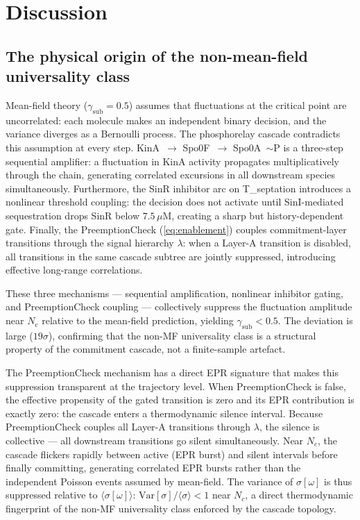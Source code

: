 \documentclass[11pt,a4paper]{article}
\newcommand{\gsub}{\gamma_{\mathrm{sub}}}
\newcommand{\Nc}{N_{\mathrm{c}}}
\begin{document}
\section{Discussion}
\label{sec:discussion}

\subsection{The physical origin of the non-mean-field universality class}

Mean-field theory ($\gsub = 0.5$) assumes that fluctuations at the
critical point are uncorrelated: each molecule makes an independent
binary decision, and the variance diverges as a Bernoulli process.
The phosphorelay cascade contradicts this assumption at every step.
KinA~$\to$ Spo0F~$\to$ Spo0A~$\sim$P is a three-step sequential amplifier:
a fluctuation in KinA activity propagates multiplicatively through
the chain, generating correlated excursions in all downstream species
simultaneously.
Furthermore, the SinR inhibitor arc on T\_septation introduces a
nonlinear threshold coupling: the decision does not activate until
SinI-mediated sequestration drops SinR below $7.5\,\mu$M, creating
a sharp but history-dependent gate.
Finally, the PreemptionCheck (\cref{eq:enablement}) couples commitment-layer
transitions through the signal hierarchy $\lambda$: when a Layer-A
transition is disabled, all transitions in the same cascade subtree are
jointly suppressed, introducing effective long-range correlations.

These three mechanisms --- sequential amplification, nonlinear inhibitor
gating, and PreemptionCheck coupling --- collectively suppress the
fluctuation amplitude near $\Nc$ relative to the mean-field prediction,
yielding $\gsub < 0.5$.
The deviation is large ($19\sigma$), confirming that the non-MF universality
class is a structural property of the commitment cascade, not a
finite-sample artefact.

The PreemptionCheck mechanism has a direct EPR signature that makes this
suppression transparent at the trajectory level.
When PreemptionCheck is false, the effective propensity of the gated
transition is zero and its EPR contribution is exactly zero: the cascade
enters a thermodynamic silence interval.
Because PreemptionCheck couples all Layer-A transitions through $\lambda$,
the silence is collective --- all downstream transitions go silent
simultaneously.
Near $N_c$, the cascade flickers rapidly between active (EPR burst) and
silent intervals before finally committing, generating correlated EPR
bursts rather than the independent Poisson events assumed by mean-field.
The variance of $\sigma[\omega]$ is thus suppressed relative to
$\langle\sigma[\omega]\rangle$: $\mathrm{Var}[\sigma]/\langle\sigma\rangle < 1$
near $N_c$, a direct thermodynamic fingerprint of the non-MF universality
class enforced by the cascade topology.
\end{document}
